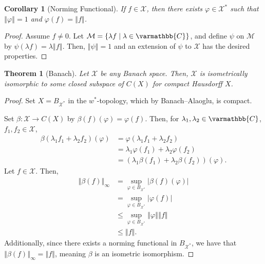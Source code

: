 \documentclass[12pt]{extarticle}
\newcommand{\C}{\mathbb{C}}
\newcommand{\norm}[1]{\left\Vert #1\right\Vert}
\newcommand{\set}[1]{\left\{#1\right\}}
\theoremstyle{plain}
\newtheorem*{theorem}{Theorem}
\newtheorem*{corollary}{Corollary}
\theoremstyle{definition}
\theoremstyle{note}
\renewcommand*{\mathbb}[1]{\varmathbb{#1}}
\renewcommand{\newline}{\hfill\break}
\begin{document}
\begin{corollary}[Norming Functional]
  If $f\in \mathcal{X}$, then there exists $\varphi \in \mathcal{X}^{\ast}$ such that $\norm{\varphi} = 1$ and $\varphi(f) = \norm{f}$.
\end{corollary}
\begin{proof}
  Assume $f\neq 0$. Let $\mathcal{M} = \set{\lambda f\mid \lambda \in \C}$, and define $\psi$ on $\mathcal{M}$ by $\psi(\lambda f) = \lambda \norm{f}$. Then, $\norm{\psi} = 1$ and an extension of $\psi$ to $\mathcal{X}$ has the desired properties.
\end{proof}
\begin{theorem}[Banach]
  Let $\mathcal{X}$ be any Banach space. Then, $\mathcal{X}$ is isometrically isomorphic to some closed subspace of $C(X)$ for compact Hausdorff $X$.
\end{theorem}
\begin{proof}
  Set $X = B_{\mathcal{X}^{\ast}}$ in the $w^{\ast}$-topology, which by Banach--Alaoglu, is compact.\newline

  Set $\beta: \mathcal{X}\rightarrow C(X)$ by $\beta(f)(\varphi) = \varphi(f)$. Then, for $\lambda_1,\lambda_2\in \C$, $f_1,f_2\in \mathcal{X}$,
  \begin{align*}
    \beta\left(\lambda_1f_1 + \lambda_2f_2\right)(\varphi) &= \varphi\left(\lambda_1 f_1 + \lambda_2f_2\right)\\
                                                           &= \lambda_1 \varphi(f_1) + \lambda_2\varphi\left(f_2\right)\\
                                                           &= \left(\lambda_1\beta\left(f_1\right) + \lambda_2\beta\left(f_2\right)\right)\left(\varphi\right).
  \end{align*}
  Let $f\in \mathcal{X}$. Then,
  \begin{align*}
    \norm{\beta(f)}_{\infty} &= \sup_{\varphi \in B_{\mathcal{X}^{\ast}}} \left\vert \beta(f)(\varphi) \right\vert\\
                             &= \sup_{\varphi \in B_{\mathcal{X}^{\ast}}}\left\vert \varphi(f) \right\vert\\
                             &\leq \sup_{\varphi \in B_{\mathcal{X}^{\ast}}}\norm{\varphi}\norm{f}\\
                             &\leq \norm{f}.
  \end{align*}
  Additionally, since there exists a norming functional in $B_{\mathcal{X}^{\ast}}$, we have that $\norm{\beta(f)}_{\infty} = \norm{f}$, meaning $\beta$ is an isometric isomorphism.
\end{proof}
\end{document}
